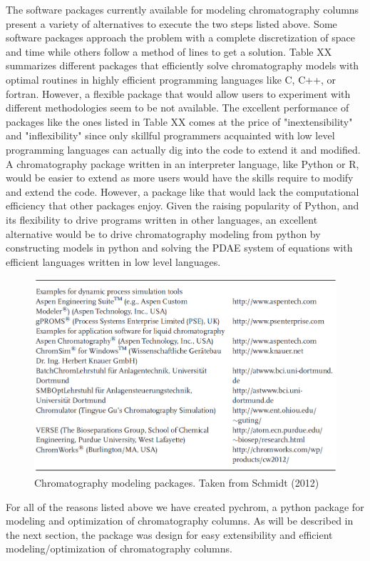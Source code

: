 \documentclass[paper=a4, fontsize=11pt]{scrartcl}
\begin{document}
The software packages currently available for modeling chromatography columns 
present a variety of alternatives to execute the two steps listed above. Some software packages approach the problem with a complete discretization of space and time while others follow a method of lines to get a solution. Table XX summarizes different packages that efficiently solve chromatography models with optimal routines in highly efficient programming languages like C, C++, or fortran. However, a flexible package that would allow users to experiment with different methodologies seem to be not available. The excellent performance of packages like the ones listed in Table XX comes at the price of "inextensibility" and "inflexibility" since only skillful programmers acquainted with low level programming languages can actually dig into the code to extend it and modified. A chromatography package written in an interpreter language, like Python or R, would be easier to extend as more users would have the skills require to modify and extend the code. However, a package like that would lack the computational efficiency that other packages enjoy. Given the raising popularity of Python, and its flexibility to drive programs written in other languages, an excellent alternative would be to drive chromatography modeling from python by constructing models in python and solving the PDAE system of equations with efficient languages written in low level languages. 
\begin{figure}[h]
\label{software}
\centering
\includegraphics[width=\textwidth]{software.png}
\caption{Chromatography modeling packages. Taken from Schmidt (2012)}
\end{figure}
For all of the reasons listed above we have created pychrom, a python package for modeling and optimization of chromatography columns. As will be described in the next section, the package was design for easy extensibility and efficient modeling/optimization of chromatography columns.
\end{document}
